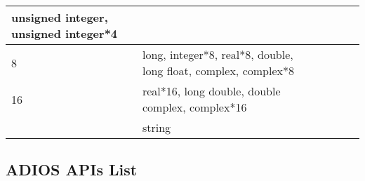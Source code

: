{\begin{longtable}{llllll}
{\begin{minipage}[t]{0.051in}
{\small unsigned integer, unsigned integer*4}\end{minipage}}\\
\hline
\multicolumn{1}{|p{0.287in}|}{\begin{minipage}[t]{0.287in}\centering
{\small 8}\end{minipage}} & \multicolumn{1}{p{2.534in}|}{\begin{minipage}[t]{2.534in}\centering
{\small long, integer*8, real*8, double, long float, complex, complex*8}\end{minipage}} & \multicolumn{4}{p{1.680in}|}{\begin{minipage}[t]{1.680in}\raggedright
\end{minipage}}\\
\hline
\multicolumn{1}{p{0.051in}|}{\begin{minipage}[t]{0.051in}\centering
{\small 16}\end{minipage}} & \multicolumn{1}{p{0.051in}|}{\begin{minipage}[t]{0.051in}\centering
{\small real*16, long double, double complex, complex*16}\end{minipage}} & \multicolumn{1}{p{0.051in}|}{\begin{minipage}[t]{0.051in}\centering
\end{minipage}}\\
\hline
\multicolumn{1}{|p{0.287in}|}{\begin{minipage}[t]{0.287in}\centering
\end{minipage}} & \multicolumn{1}{p{2.534in}|}{\begin{minipage}[t]{2.534in}\centering
{\small string}\end{minipage}} & \multicolumn{4}{p{1.680in}|}{\begin{minipage}[t]{1.680in}\raggedright
\end{minipage}}\\
\hline
\end{longtable}
\label{HToc182553462}}

\vspace{23pt}
\subsection{ADIOS APIs List}



